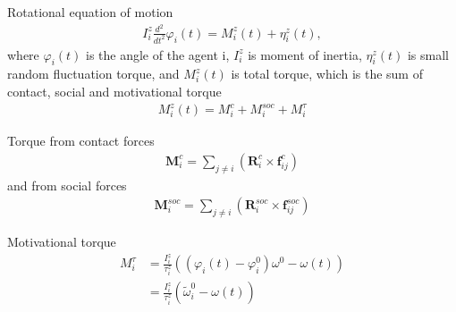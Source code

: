 
Rotational equation of motion 
\begin{align}
I_{i}^{z} \frac{d^{2}}{d t^{2}} \varphi_{i}(t) = M_{i}^{z}(t) + \eta_{i}^{z}(t),
\end{align}
where $ \varphi_{i}(t) $ is the angle of the agent i, $ I_{i}^{z} $ is moment of inertia, $ \eta_{i}^{z}(t) $ is small random fluctuation torque, and $ M_{i}^{z}(t) $ is total torque, which is the sum of contact, social and motivational torque
\begin{align}
M_{i}^{z}(t) = M_{i}^{c} + M_{i}^{soc} + M_{i}^{\tau}
\end{align}

Torque from contact forces
\begin{align}
\mathbf{M}_{i}^{c} = \sum_{j\neq i}^{} \left(\mathbf{R}_{i}^{c} \times \mathbf{f}_{ij}^{c}\right)
\end{align}
and from social forces
\begin{align}
\mathbf{M}_{i}^{soc} = \sum_{j\neq i}^{} \left(\mathbf{R}_{i}^{soc} \times \mathbf{f}_{ij}^{soc}\right)
\end{align}

Motivational torque
\begin{align}
M_{i}^{\tau} &= \frac{I_{i}^{z}}{\tau_{i}^{z}} \left((\varphi_{i}(t) - \varphi_{i}^{0}) \omega^{0} - \omega(t)\right) \\
&= \frac{I_{i}^{z}}{\tau_{i}^{z}} \left(\tilde{\omega}_{i}^{0} - \omega(t)\right)
\end{align}


